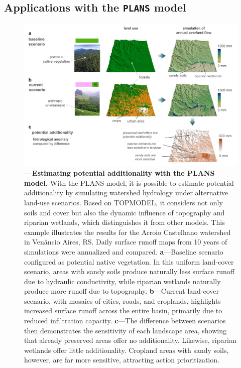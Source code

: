 \documentclass[./main_en.tex]{subfiles}
\begin{document}
\subsection{Applications with the \texttt{PLANS} model}

\begin{figure}[t!] 
\centering				
\includegraphics[width=0.98\linewidth]{figs/fig_addplans_en.jpg}		
\caption[Potential additionality with the PLANS model]
{\textbf{---\;Estimating potential additionality with the PLANS model.}
    With the PLANS model, it is possible to estimate potential additionality by simulating watershed hydrology under alternative land-use scenarios. Based on TOPMODEL, it considers not only soils and cover but also the dynamic influence of topography and riparian wetlands, which distinguishes it from other models. This example illustrates the results for the Arroio Castelhano watershed in Venâncio Aires, RS. Daily surface runoff maps from 10 years of simulations were annualized and compared.    
    \;\textbf{a}\;---\;Baseline scenario configured as potential native vegetation. In this uniform land-cover scenario, areas with sandy soils produce naturally less surface runoff due to hydraulic conductivity, while riparian wetlands naturally produce more runoff due to topography.
    \;\textbf{b}\;---\;Current land-cover scenario, with mosaics of cities, roads, and croplands, highlights increased surface runoff across the entire basin, primarily due to reduced infiltration capacity.    
    \;\textbf{c}\;---\;The difference between scenarios then demonstrates the sensitivity of each landscape area, showing that already preserved areas offer no additionality. Likewise, riparian wetlands offer little additionality. Cropland areas with sandy soils, however, are far more sensitive, attracting action prioritization.
}
\label{fig:eco:addplans1} 		
\end{figure}
\end{document}
